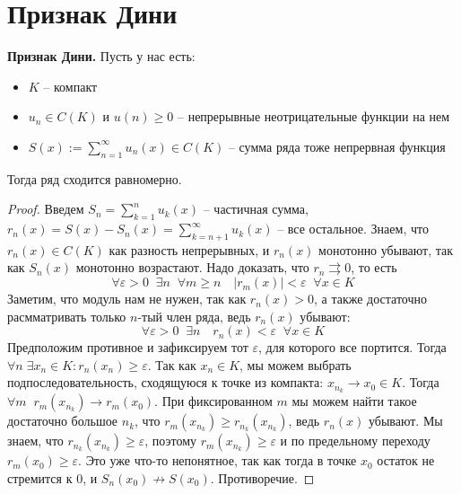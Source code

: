 \section{Признак Дини}
\textbf{Признак Дини.} 
Пусть у нас есть:
\begin{itemize}
    \item $K$ -- компакт
    \item $u_n \in C(K)$ и $u(n) \geqslant 0$ -- непрерывные неотрицательные функции на нем
    \item $S(x) := \sum\limits_{n = 1}^\infty u_n(x) \in C(K)$ -- сумма ряда тоже непрервная функция
\end{itemize}
Тогда ряд сходится равномерно.
\begin{proof}
    Введем $S_n = \sum\limits_{k = 1}^n u_k(x)$ -- частичная сумма, $r_n(x) = S(x) - S_n(x) = \sum\limits_{k = n+1}^\infty u_k(x)$ -- все остальное.
    Знаем, что $r_n(x) \in C(K)$ как разность непрерывных, и $r_n(x)$ монотонно убывают, так как $S_n(x)$ монотонно возрастают.
    Надо доказать, что $r_n \rightrightarrows 0$, то есть \[ \forall \varepsilon > 0  \;\; \exists n \;\; \forall m \geqslant n \quad |r_m(x)| < \varepsilon \;\; \forall x \in K \]
    Заметим, что модуль нам не нужен, так как $r_n(x) > 0$, а также достаточно расмматривать только $n$-тый член ряда, ведь $r_n(x)$ убывают:
    \[ \forall \varepsilon > 0  \;\; \exists n \quad r_n(x) < \varepsilon \;\; \forall x \in K \]
    Предположим противное и зафиксируем тот $\varepsilon$, для которого все портится.
    Тогда $\forall n \; \exists x_n \in K : r_n(x_n) \geqslant \varepsilon$. 
    Так как $x_n \in K$, мы можем выбрать подпоследовательность, сходящуюся к точке из компакта: $x_{n_k} \to x_0 \in K$.
    Тогда $\forall m \;\; r_m(x_{n_k}) \to r_m(x_0)$. 
    При фиксированном $m$ мы можем найти такое достаточно большое $n_k$, что $r_m(x_{n_k}) \geqslant r_{n_k}(x_{n_k})$, ведь $r_n(x)$ убывают.
    Мы знаем, что $r_{n_k}(x_{n_k}) \geqslant \varepsilon$, поэтому $r_m(x_{n_k}) \geqslant \varepsilon$ и по предельному переходу $r_m(x_0) \geqslant \varepsilon$.
    Это уже что-то непонятное, так как тогда в точке $x_0$ остаток не стремится к 0, и $S_n(x_0) \nrightarrow S(x_0)$. Противоречие. 
\end{proof}
